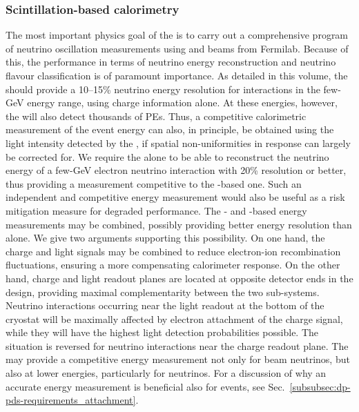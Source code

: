 \subsubsection{Scintillation-based calorimetry}

The most important physics goal of the \dune {} is to carry out a comprehensive program of neutrino oscillation measurements using \numu and \anumu beams from Fermilab. Because of this, the \dune {} performance in terms of neutrino energy reconstruction and neutrino flavour classification is of paramount importance. As detailed in this volume, the  should provide a 10--15\% neutrino energy resolution for \nue {} interactions in the few-GeV energy range, using charge information alone. At these energies, however, the  will also detect thousands of PEs. Thus, a competitive calorimetric measurement of the event energy can also, in principle, be obtained using the light intensity detected by the , if spatial non-uniformities in  response can largely be corrected for. We require the  alone to be able to reconstruct the neutrino energy of a few-GeV electron neutrino  interaction with 20\%  resolution or better, thus providing a measurement competitive to the -based one. Such an independent and competitive energy measurement would also be useful as a risk mitigation measure for degraded  performance. The - and -based energy measurements may be combined, possibly providing better energy resolution than  alone. We give two arguments supporting this possibility. On one hand, the charge and light signals may be combined to reduce electron-ion recombination fluctuations, ensuring a more compensating  calorimeter response. On the other hand, charge and light readout planes are located at opposite detector ends in the  design, providing maximal complementarity between the two sub-systems. Neutrino interactions occurring near the light readout at the bottom of the cryostat will be maximally affected by electron attachment of the charge signal, while they will have the highest light detection probabilities possible. The situation is reversed for neutrino interactions near the charge readout plane. The  may provide a competitive energy measurement not only for beam neutrinos, but also at lower energies, particularly for  neutrinos. For a discussion of why an accurate energy measurement is beneficial also for  events, see Sec.~\ref{subsubsec:dp-pds-requirements_attachment}.

